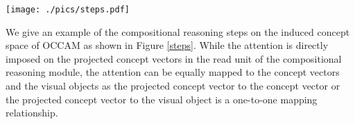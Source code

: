 \documentclass[final]{cvpr}
\begin{document}
\begin{figure*}
\centering
\texttt{[image: ./pics/steps.pdf]}
\caption{Visualization of reasoning steps. (a) The question, image, prediction and ground truth answer. The index of each object is shown on the upper left of the object. (b) The induced concepts of objects and relations. (c) The stepwise attentions on question words. (d) The stepwise attentions on objects. (e) The concept vector read into the memory of the reasoning module in each step.}
\label{steps}
\end{figure*}

We give an example of the compositional reasoning steps on the induced concept space of OCCAM as shown in Figure \ref{steps}. While the attention is directly imposed on the projected concept vectors in the read unit of the compositional reasoning module, the attention can be equally mapped to the concept vectors and the visual objects as the projected concept vector to the concept vector or the projected concept vector to the visual object is a one-to-one mapping relationship.
\end{document}
